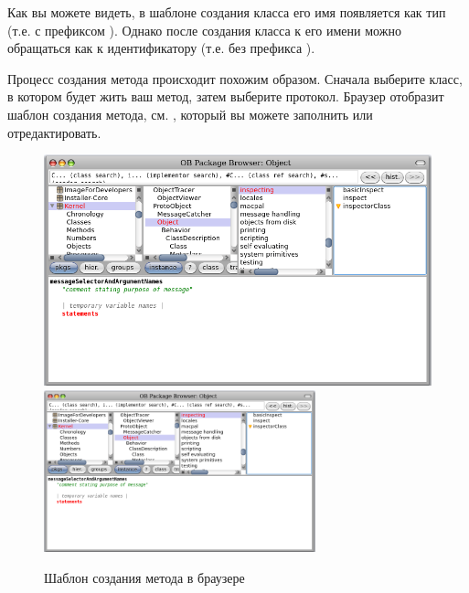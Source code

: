 \documentclass[a4paper,10pt,twoside]{book}
\begin{document}

Как вы можете видеть, в шаблоне создания класса его имя появляется как тип  (т.е. с префиксом \ct{#}). Однако после создания класса к его имени можно обращаться как к идентификатору (т.е. без префикса \ct{#}).


Процесс создания метода происходит похожим образом. Сначала выберите класс, в котором будет жить ваш метод, затем выберите протокол. Браузер отобразит шаблон создания метода, см. , который вы можете заполнить или отредактировать.

\begin{figure}[htbp]
   \centering
   \ifluluelse
	   {\includegraphics [width=\textwidth]{SystemBrowserMethodTemplate}}
	   {\includegraphics[width=0.7\textwidth]{SystemBrowserMethodTemplate}}
   \caption{Шаблон создания метода в браузере
   }
\end{figure}
\end{document}
